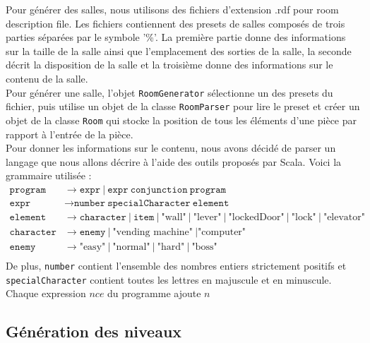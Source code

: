 \documentclass[10pt,a4paper]{article}
\begin{document}
Pour générer des salles, nous utilisons des fichiers d'extension .rdf pour room description file. Les fichiers contiennent des presets de salles composés de trois parties séparées par le symbole '\%'. La première partie donne des informations sur la taille de la salle ainsi que l'emplacement des sorties de la salle, la seconde décrit la disposition de la salle et la troisième donne des informations sur le contenu de la salle.\\
Pour générer une salle, l'objet \texttt{RoomGenerator} sélectionne un des presets du fichier, puis utilise un objet de la classe \texttt{RoomParser} pour lire le preset et créer un objet de la classe \texttt{Room} qui stocke la position de tous les éléments d'une pièce par rapport à l'entrée de la pièce.\\
Pour donner les informations sur le contenu, nous avons décidé de parser un langage que nous allons décrire à l'aide des outils proposés par Scala. Voici la grammaire utilisée :\\
\begin{align*}
	\texttt{program}   & \to \texttt{expr}\ |\ \texttt{expr}\ \texttt{conjunction}\ \texttt{program}                                                                   \\
	\texttt{expr}      & \to \texttt{number}\ \texttt{specialCharacter}\ \texttt{element}                                                                              \\
	\texttt{element}   & \to \texttt{character}\ |\ \texttt{item}\ |\ \mbox{"wall"}\ |\ \mbox{"lever"}\ |\ \mbox{"lockedDoor"}\ |\ \mbox{"lock"}\ |\ \mbox{"elevator"} \\
	\texttt{character} & \to \texttt{enemy}\ |\ \mbox{"vending machine"}\ | \mbox{"computer"}                                                                          \\
	\texttt{enemy}     & \to \mbox{"easy"}\ |\ \mbox{"normal"}\ |\ \mbox{"hard"}\ |\ \mbox{"boss"}                                                                     \\
\end{align*}
De plus, \texttt{number} contient l'ensemble des nombres entiers strictement positifs et \texttt{specialCharacter} contient toutes les lettres en majuscule et en minuscule.\\
Chaque expression $n c e$ du programme ajoute $n$


\subsection{Génération des niveaux}
\end{document}
